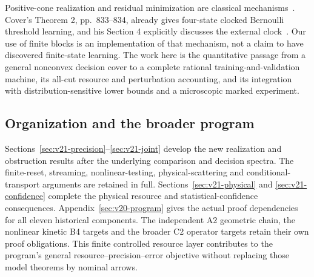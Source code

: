Positive-cone realization and residual minimization are classical
mechanisms~\cite{Fliess1975,Nerode1958}. Cover's Theorem 2, pp.~833--834,
already gives four-state clocked Bernoulli threshold learning, and his
Section 4 explicitly discusses the external clock~\cite{Cover1969}.
Our use of finite blocks is an implementation of that mechanism, not a
claim to have discovered finite-state learning. The work here is the
quantitative passage from a general nonconvex decision cover to a
complete rational training-and-validation machine, its all-cut resource
and perturbation accounting, and its integration with distribution-sensitive
lower bounds and a microscopic marked experiment.

\subsection{Organization and the broader program}
Sections~\ref{sec:v21-precision}--\ref{sec:v21-joint} develop the new
realization and obstruction results after the underlying comparison and
decision spectra. The finite-reset, streaming, nonlinear-testing,
physical-scattering and conditional-transport arguments are retained in
full. Sections~\ref{sec:v21-physical} and \ref{sec:v21-confidence}
complete the physical resource and statistical-confidence consequences.
Appendix~\ref{sec:v20-program} gives the actual proof dependencies for
all eleven historical components. The independent A2 geometric chain,
the nonlinear kinetic B4 targets and the broader C2 operator targets
retain their own proof obligations. This finite controlled resource
layer contributes to the program's general resource--precision--error
objective without replacing those model theorems by nominal arrows.
